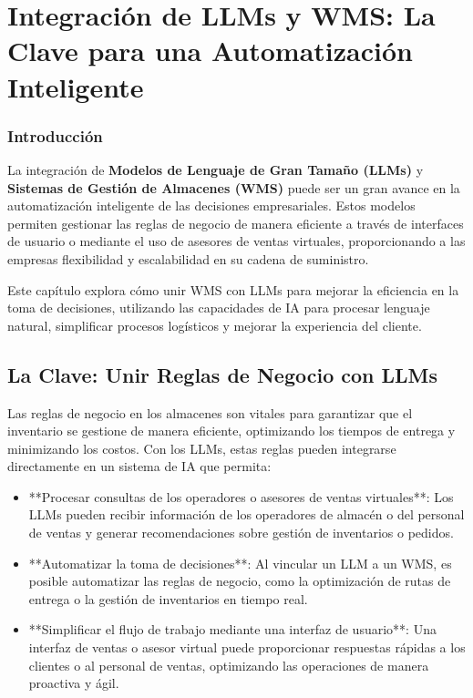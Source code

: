 \section{Integración de LLMs y WMS: La Clave para una Automatización Inteligente}

\subsubsection{Introducción}

La integración de \textbf{Modelos de Lenguaje de Gran Tamaño (LLMs)} y \textbf{Sistemas de Gestión de Almacenes (WMS)} puede ser un gran avance en la automatización inteligente de las decisiones empresariales. Estos modelos permiten gestionar las reglas de negocio de manera eficiente a través de interfaces de usuario o mediante el uso de asesores de ventas virtuales, proporcionando a las empresas flexibilidad y escalabilidad en su cadena de suministro.

Este capítulo explora cómo unir WMS con LLMs para mejorar la eficiencia en la toma de decisiones, utilizando las capacidades de IA para procesar lenguaje natural, simplificar procesos logísticos y mejorar la experiencia del cliente.

\subsection{La Clave: Unir Reglas de Negocio con LLMs}

Las reglas de negocio en los almacenes son vitales para garantizar que el inventario se gestione de manera eficiente, optimizando los tiempos de entrega y minimizando los costos. Con los LLMs, estas reglas pueden integrarse directamente en un sistema de IA que permita:

\begin{itemize}
    \item **Procesar consultas de los operadores o asesores de ventas virtuales**: Los LLMs pueden recibir información de los operadores de almacén o del personal de ventas y generar recomendaciones sobre gestión de inventarios o pedidos.
    \item **Automatizar la toma de decisiones**: Al vincular un LLM a un WMS, es posible automatizar las reglas de negocio, como la optimización de rutas de entrega o la gestión de inventarios en tiempo real.
    \item **Simplificar el flujo de trabajo mediante una interfaz de usuario**: Una interfaz de ventas o asesor virtual puede proporcionar respuestas rápidas a los clientes o al personal de ventas, optimizando las operaciones de manera proactiva y ágil.
\end{itemize}

